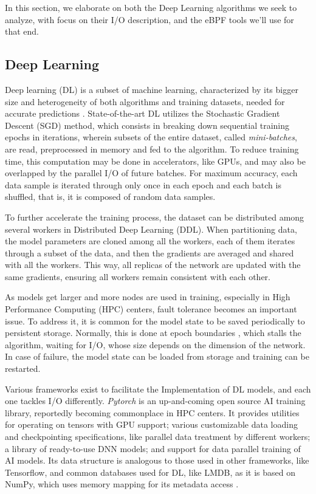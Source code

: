 \documentclass[conference]{IEEEtran}
\begin{document}
In this section, we elaborate on both the Deep Learning algorithms we seek to analyze, with focus on their I/O description, and the eBPF tools we'll use for that end.

\subsection{Deep Learning}

Deep learning (DL) is a subset of machine learning, characterized by its bigger size and heterogeneity of both algorithms and training datasets, needed for accurate predictions \cite{gradient}. State-of-the-art DL utilizes the Stochastic Gradient Descent (SGD) method, which consists in breaking down sequential training epochs in iterations, wherein subsets of the entire dataset, called \textit{mini-batches}, are read, preprocessed in memory and fed to the algorithm. To reduce training time, this computation may be done in accelerators, like GPUs, and may also be overlapped by the parallel I/O of future batches. For maximum accuracy, each data sample is iterated through only once in each epoch and each batch is shuffled, that is, it is composed of random data samples.

To further accelerate the training process, the dataset can be distributed among several workers in Distributed Deep Learning (DDL). When partitioning data, the model parameters are cloned among all the workers, each of them iterates through a subset of the data, and then the gradients are averaged and shared with all the workers. This way, all replicas of the network are updated with the same gradients, ensuring all workers remain consistent with each other.

As models get larger and more nodes are used in training, especially in High Performance Computing (HPC) centers, fault tolerance becomes an important issue. To address it, it is common for the model state to be saved periodically to persistent storage. Normally, this is done at epoch boundaries \cite{checkfreq}, which stalls the algorithm, waiting for I/O, whose size depends on the dimension of the network. In case of failure, the model state can be loaded from storage and training can be restarted.

Various frameworks exist to facilitate the Implementation of DL models, and each one tackles I/O differently. \textit{Pytorch} \cite{pytorch} is an up-and-coming open source AI training library, reportedly becoming commonplace in HPC centers. It provides utilities for operating on tensors with GPU support; various customizable data loading and checkpointing specifications, like parallel data treatment by different workers; a library of ready-to-use DNN models; and support for data parallel training of AI models. Its data structure is analogous to those used in other frameworks, like Tensorflow, and common databases used for DL, like LMDB, as it is based on NumPy, which uses memory mapping for its metadata access \cite{LMDB}.
\end{document}
